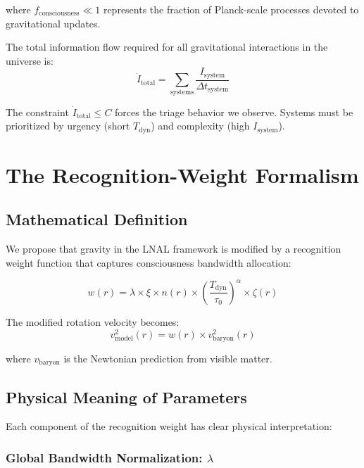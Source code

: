 \documentclass[twocolumn,prd,amsmath,amssymb,aps,superscriptaddress,nofootinbib]{revtex4-2}
\begin{document}
where $f_{\text{consciousness}} \ll 1$ represents the fraction of Planck-scale processes devoted to gravitational updates.

The total information flow required for all gravitational interactions in the universe is:
\begin{equation}
\dot{I}_{\text{total}} = \sum_{\text{systems}} \frac{I_{\text{system}}}{\Delta t_{\text{system}}}
\end{equation}

The constraint $\dot{I}_{\text{total}} \leq C$ forces the triage behavior we observe. Systems must be prioritized by urgency (short $T_{\text{dyn}}$) and complexity (high $I_{\text{system}}$).

\section{The Recognition-Weight Formalism}
\label{sec:formalism}

\subsection{Mathematical Definition}

We propose that gravity in the LNAL framework is modified by a recognition weight function that captures consciousness bandwidth allocation:

\begin{equation}
w(r) = \lambda \times \xi \times n(r) \times \left(\frac{T_{\text{dyn}}}{\tau_0}\right)^\alpha \times \zeta(r)
\label{eq:recognition_weight}
\end{equation}

The modified rotation velocity becomes:
\begin{equation}
v_{\text{model}}^2(r) = w(r) \times v_{\text{baryon}}^2(r)
\label{eq:v_model}
\end{equation}

where $v_{\text{baryon}}$ is the Newtonian prediction from visible matter.

\subsection{Physical Meaning of Parameters}

Each component of the recognition weight has clear physical interpretation:

\subsubsection{Global Bandwidth Normalization: $\lambda$}
\end{document}
